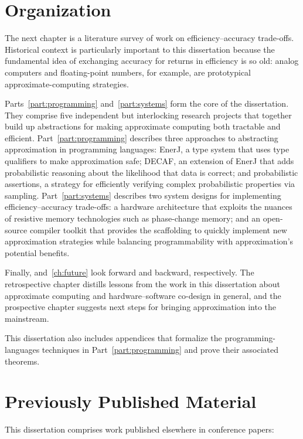 \section{Organization}

The next chapter is a literature survey of work on efficiency--accuracy
trade-offs.
Historical context is particularly important to this dissertation because the
fundamental idea of exchanging accuracy for returns in efficiency is so old:
analog computers and floating-point numbers, for example, are prototypical
approximate-computing strategies.

Parts~\ref{part:programming} and~\ref{part:systems} form the core of the
dissertation.
They comprise five independent but interlocking research projects that
together build up abstractions for making approximate computing both tractable
and efficient.
%
Part~\ref{part:programming} describes three approaches to abstracting
approximation in programming languages:
EnerJ, a type system that uses type qualifiers to make approximation safe;
DECAF, an extension of EnerJ that adds probabilistic reasoning
about the likelihood that data is correct;
and probabilistic assertions, a strategy for efficiently verifying complex
probabilistic properties via sampling.
%
Part~\ref{part:systems} describes two system designs for implementing
efficiency--accuracy trade-offs:
a hardware architecture that exploits the nuances of resistive memory
technologies such as phase-change memory;
and an open-source compiler toolkit that provides the scaffolding to quickly
implement new approximation strategies while balancing programmability with
approximation's potential benefits.

Finally,  and~\ref{ch:future} look forward and
backward, respectively.
The retrospective chapter distills lessons from the work in this dissertation
about approximate computing and hardware--software co-design in general, and
the prospective chapter suggests next steps for bringing approximation into
the mainstream.

This dissertation also includes appendices that formalize the
programming-languages techniques in Part~\ref{part:programming} and prove
their associated theorems.


\section{Previously Published Material}

This dissertation comprises work published elsewhere in conference papers:

